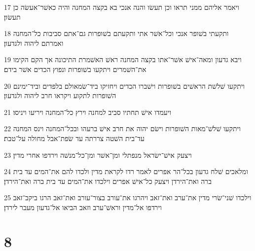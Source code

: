 \par 17 ויאמר אליהם ממני תראו וכן תעשׂו והנה אנכי בא בקצה המחנה והיה כאשׁר־אעשׂה כן תעשׂון׃
\par 18 ותקעתי בשׁופר אנכי וכל־אשׁר אתי ותקעתם בשׁופרות גם־אתם סביבות כל־המחנה ואמרתם ליהוה ולגדעון׃
\par 19 ויבא גדעון ומאה־אישׁ אשׁר־אתו בקצה המחנה ראשׁ האשׁמרת התיכונה אך הקם הקימו את־השׁמרים ויתקעו בשׁופרות ונפוץ הכדים אשׁר בידם׃
\par 20 ויתקעו שׁלשׁת הראשׁים בשׁופרות וישׁברו הכדים ויחזיקו ביד־שׂמאולם בלפדים וביד־ימינם השׁופרות לתקוע ויקראו חרב ליהוה ולגדעון׃
\par 21 ויעמדו אישׁ תחתיו סביב למחנה וירץ כל־המחנה ויריעו ויניסו׃
\par 22 ויתקעו שׁלשׁ־מאות השׁופרות וישׂם יהוה את חרב אישׁ ברעהו ובכל־המחנה וינס המחנה עד־בית השׁטה צררתה עד שׂפת־אבל מחולה על־טבת׃
\par 23 ויצעק אישׁ־ישׂראל מנפתלי ומן־אשׁר ומן־כל־מנשׁה וירדפו אחרי מדין׃
\par 24 ומלאכים שׁלח גדעון בכל־הר אפרים לאמר רדו לקראת מדין ולכדו להם את־המים עד בית ברה ואת־הירדן ויצעק כל־אישׁ אפרים וילכדו את־המים עד בית ברה ואת־הירדן׃
\par 25 וילכדו שׁני־שׂרי מדין את־ערב ואת־זאב ויהרגו את־עורב בצור־עורב ואת־זאב הרגו ביקב־זאב וירדפו אל־מדין וראשׁ־ערב וזאב הביאו אל־גדעון מעבר לירדן׃

\chapter{8}

